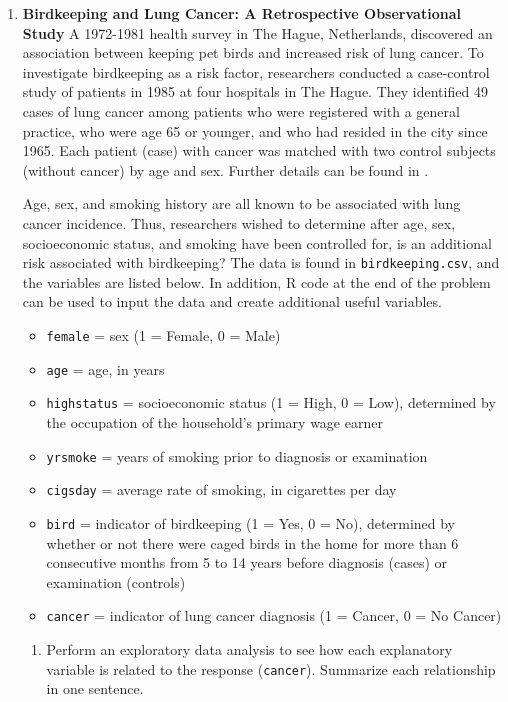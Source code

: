 \documentclass[
]{krantz}
\providecommand{\tightlist}{%
  \setlength{\itemsep}{0pt}\setlength{\parskip}{0pt}}
\begin{document}
\begin{enumerate}
\def\labelenumi{\arabic{enumi}.}
\setcounter{enumi}{3}
\item
  \textbf{Birdkeeping and Lung Cancer: A Retrospective Observational Study} A 1972-1981 health survey in The Hague, Netherlands, discovered an association between keeping pet birds and increased risk of lung cancer. To investigate birdkeeping as a risk factor, researchers conducted a case-control study of patients in 1985 at four hospitals in The Hague. They identified 49 cases of lung cancer among patients who were registered with a general practice, who were age 65 or younger, and who had resided in the city since 1965. Each patient (case) with cancer was matched with two control subjects (without cancer) by age and sex. Further details can be found in \citet{Holst1988}.

  Age, sex, and smoking history are all known to be associated with lung cancer incidence. Thus, researchers wished to determine after age, sex, socioeconomic status, and smoking have been controlled for, is an additional risk associated with birdkeeping? The data \citep{Ramsey2002} is found in \texttt{birdkeeping.csv}, and the variables are listed below. In addition, R code at the end of the problem can be used to input the data and create additional useful variables.

  \begin{itemize}
  \tightlist
  \item
    \texttt{female} = sex (1 = Female, 0 = Male)
  \item
    \texttt{age} = age, in years
  \item
    \texttt{highstatus} = socioeconomic status (1 = High, 0 = Low), determined by the occupation of the household's primary wage earner
  \item
    \texttt{yrsmoke} = years of smoking prior to diagnosis or examination
  \item
    \texttt{cigsday} = average rate of smoking, in cigarettes per day
  \item
    \texttt{bird} = indicator of birdkeeping (1 = Yes, 0 = No), determined by whether or not there were caged birds in the home for more than 6 consecutive months from 5 to 14 years before diagnosis (cases) or examination (controls)
  \item
    \texttt{cancer} = indicator of lung cancer diagnosis (1 = Cancer, 0 = No Cancer)
  \end{itemize}

  \begin{enumerate}
  \def\labelenumii{\alph{enumii}.}
  \tightlist
  \item
    Perform an exploratory data analysis to see how each explanatory variable is related to the response (\texttt{cancer}). Summarize each relationship in one sentence.
  \end{enumerate}


\end{enumerate}
\end{document}
